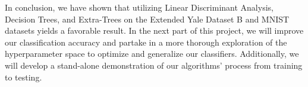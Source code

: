 In conclusion, we have shown that utilizing Linear Discriminant Analysis, Decision Trees, and Extra-Trees on the Extended Yale Dataset B and MNIST datasets yields a favorable result. In the next part of this project, we will improve our classification accuracy and partake in a more thorough exploration of the hyperparameter space to optimize and generalize our classifiers. Additionally, we will develop a stand-alone demonstration of our algorithms' process from training to testing. 